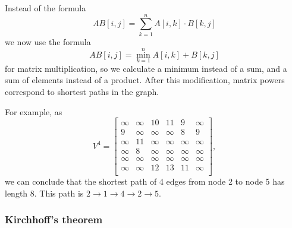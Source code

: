 Instead of the formula
\[
AB[i,j] = \sum_{k=1}^n A[i,k] \cdot B[k,j]
\]
we now use the formula
\[
AB[i,j] = \min_{k=1}^n A[i,k] + B[k,j]
\]
for matrix multiplication, so we calculate
a minimum instead of a sum,
and a sum of elements instead of a product.
After this modification,
matrix powers correspond to
shortest paths in the graph.

For example, as
\[
V^4= \begin{bmatrix}
  \infty & \infty & 10 & 11 & 9 & \infty \\
  9 & \infty & \infty & \infty & 8 & 9 \\
  \infty & 11 & \infty & \infty & \infty & \infty \\
  \infty & 8 & \infty & \infty & \infty & \infty \\
  \infty & \infty & \infty & \infty & \infty & \infty \\
  \infty & \infty & 12 & 13 & 11 & \infty \\
 \end{bmatrix},
\]
we can conclude that the shortest path of 4 edges
from node 2 to node 5 has length 8.
This path is
$2 \rightarrow 1 \rightarrow 4 \rightarrow 2 \rightarrow 5$.

\subsubsection{Kirchhoff's theorem}


